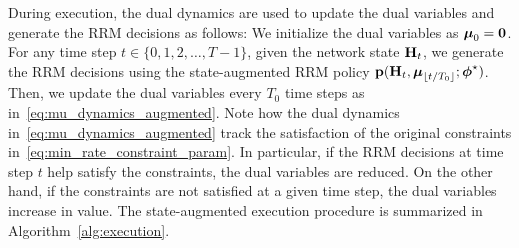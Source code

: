 \documentclass[lettersize,journal]{IEEEtran}
\begin{document}

During execution, the dual dynamics are used to update the dual variables and generate the RRM decisions as follows: We initialize the dual variables as $\boldsymbol{\mu}_0 = {\mathbf 0}$. For any time step $t\in\{0,1,2,\dots,T-1\}$, given the network state ${\mathbf H}_t$, we generate the RRM decisions using the state-augmented RRM policy ${\mathbf p}({\mathbf H}_t, \boldsymbol{\mu}_{\lfloor t / T_0 \rfloor};\boldsymbol{\phi}^{\star})$. Then, we update the dual variables every $T_0$ time steps as in~\eqref{eq:mu_dynamics_augmented}.
Note how the dual dynamics in~\eqref{eq:mu_dynamics_augmented} track the satisfaction of the original constraints in~\eqref{eq:min_rate_constraint_param}. In particular, if the RRM decisions at time step $t$ help satisfy the constraints, the dual variables are reduced. On the other hand, if the constraints are not satisfied at a given time step, the dual variables increase in value. The state-augmented execution procedure is summarized in Algorithm~\ref{alg:execution}.


\end{document}
